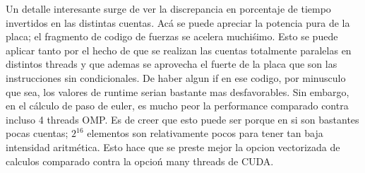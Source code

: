 Un detalle interesante surge de ver la discrepancia en porcentaje de tiempo invertidos en las distintas cuentas. Ac\'a se puede apreciar
la potencia pura de la placa; el fragmento de codigo de fuerzas se acelera muchi\'simo. Esto se puede aplicar tanto por el hecho de
que se realizan las cuentas totalmente paralelas en distintos threads y que ademas se aprovecha el fuerte de la placa que son
las instrucciones sin condicionales. De haber algun if en ese codigo, por minusculo que sea, los valores de runtime serian bastante
mas desfavorables. Sin embargo, en el c\'alculo de paso de euler, es mucho peor la performance comparado contra incluso 4 threads OMP.
Es de creer que esto puede ser porque en si son bastantes pocas cuentas; $2^{16}$ elementos son relativamente pocos para tener 
tan baja intensidad aritm\'etica. Esto hace que se preste mejor la opcion vectorizada de calculos comparado contra la opcio\'n 
many threads de CUDA. 
